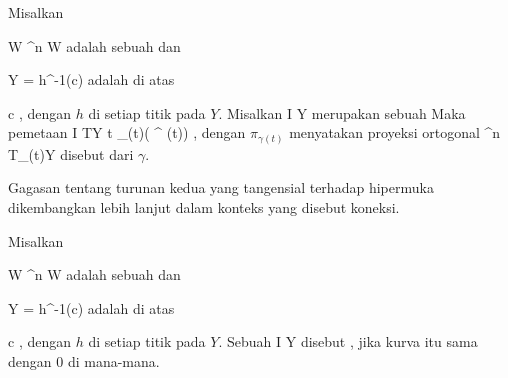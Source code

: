 {}
{

Misalkan

\mavergleichskette
{\vergleichskette
{ W
}
{ \subseteq }{ \R^n
}
{  }{
}
{    }{
}
{   }{
}
}
{}{}{}
 { W } { \R
} {}
adalah sebuah
dan

\mavergleichskette
{\vergleichskette
{ Y
}
{ = }{ h^{-1}(c)
}
{  }{
}
{    }{
}
{   }{
}
}
{}{}{}
adalah
di atas

\mavergleichskette
{\vergleichskette
{ c
}
{ \in }{ \R
}
{  }{
}
{    }{
}
{   }{
}
}
{}{}{,}
dengan $h$
di setiap titik pada $Y$. Misalkan
\maabbdisp {\gamma} {I} {Y
} {}
merupakan
 {} {}
sebuah 
Maka pemetaan
\maabbeledisp {} {I} { TY
} {t} { \pi_{\gamma(t)}( \gamma^{\prime \prime} (t))
} {,}
dengan $\pi_{\gamma(t)}$ menyatakan proyeksi ortogonal
\maabbdisp {} {\R^n } { T_{\gamma(t)}Y
} {}
disebut
 {} {}
dari $\gamma$.

}

Gagasan tentang turunan kedua yang tangensial terhadap hipermuka dikembangkan lebih lanjut dalam konteks yang disebut koneksi.


{}
{

Misalkan

\mavergleichskette
{\vergleichskette
{ W
}
{ \subseteq }{ \R^n
}
{  }{
}
{    }{
}
{   }{
}
}
{}{}{}
 { W } { \R
} {}
adalah sebuah
dan

\mavergleichskette
{\vergleichskette
{ Y
}
{ = }{ h^{-1}(c)
}
{  }{
}
{    }{
}
{   }{
}
}
{}{}{}
adalah
di atas

\mavergleichskette
{\vergleichskette
{ c
}
{ \in }{ \R
}
{  }{
}
{    }{
}
{   }{
}
}
{}{}{,}
dengan $h$
di setiap titik pada $Y$. Sebuah
 {} {}
\maabbdisp {\gamma} {I} {Y
} {}
disebut
 {} {,}
jika
kurva itu sama dengan $0$ di mana-mana.

}

